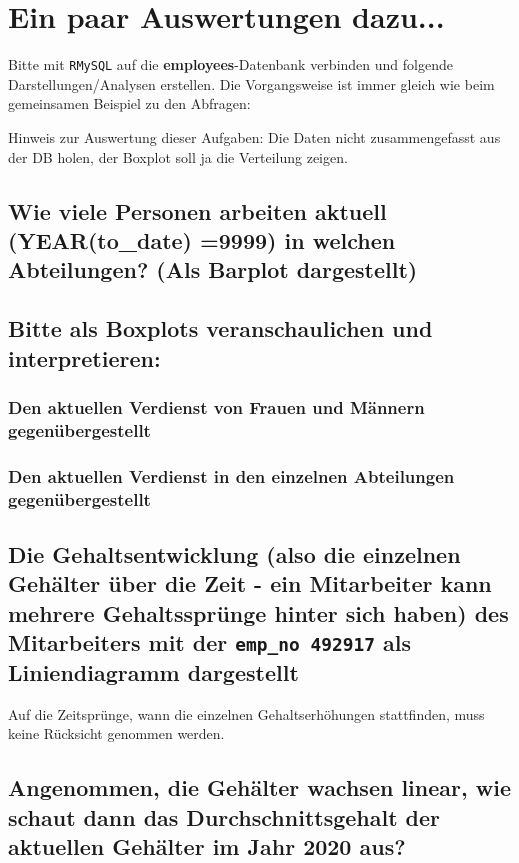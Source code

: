 \documentclass{article}
\begin{document}
\section{Ein paar Auswertungen dazu...}

Bitte mit \texttt{RMySQL} auf die \textbf{employees}-Datenbank verbinden und folgende Darstellungen/Analysen erstellen. Die Vorgangsweise ist immer gleich wie beim gemeinsamen Beispiel zu den Abfragen:




Hinweis zur Auswertung dieser Aufgaben: Die Daten nicht zusammengefasst aus der DB holen, der Boxplot soll ja die Verteilung zeigen.

\subsection{Wie viele Personen arbeiten aktuell (YEAR(to\_date) =9999) in welchen Abteilungen? (Als Barplot dargestellt)}

\subsection{Bitte als Boxplots veranschaulichen und interpretieren:}

\subsubsection{Den aktuellen Verdienst von Frauen und Männern gegenübergestellt}

\subsubsection{Den aktuellen Verdienst in den einzelnen Abteilungen gegenübergestellt}

\subsection{Die Gehaltsentwicklung (also die einzelnen Gehälter über die Zeit - ein Mitarbeiter kann mehrere Gehaltssprünge hinter sich haben) des Mitarbeiters mit der \texttt{emp\_no 492917} als Liniendiagramm dargestellt}

Auf die Zeitsprünge, wann die einzelnen Gehaltserhöhungen stattfinden, muss keine Rücksicht genommen werden.

\subsection{Angenommen, die Gehälter wachsen linear, wie schaut dann das Durchschnittsgehalt der aktuellen Gehälter im Jahr 2020 aus?}
\end{document}
